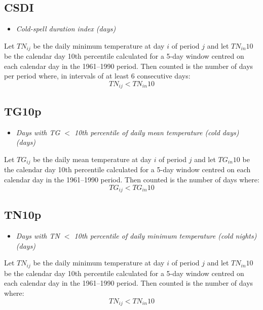 \documentclass[a4paper,11pt]{article}
\begin{document}
\subsection*{CSDI}
\begin{itemize}
\item \textit{Cold-spell duration index (days)}
\end{itemize}
Let $TN_{ij}$ be the daily minimum temperature at day $i$ of period
$j$ and let $TN_{in}10$ be the calendar day 10th percentile calculated
for a 5-day window centred on each calendar day in the 1961--1990
period. Then counted is the number of days per period where, in
intervals of at least 6 consecutive days:
\begin{equation*}
TN_{ij} < TN_{in}10
\end{equation*}

\subsection*{TG10p}
\begin{itemize}
\item \textit{Days with TG $<$ 10th percentile of daily mean temperature
(cold days) (days)}
\end{itemize}
Let $TG_{ij}$ be the daily mean temperature at day $i$ of period $j$
and let $TG_{in}10$ be the calendar day 10th percentile calculated for
a 5-day window centred on each calendar day in the 1961--1990
period. Then counted is the number of days where:
\begin{equation*}
TG_{ij} < TG_{in}10
\end{equation*}

\subsection*{TN10p}
\begin{itemize}
\item \textit{Days with TN $<$ 10th percentile of daily minimum
temperature (cold nights) (days)}
\end{itemize}
Let $TN_{ij}$ be the daily minimum temperature at day $i$ of period
$j$ and let $TN_{in}10$ be the calendar day 10th percentile calculated
for a 5-day window centred on each calendar day in the 1961--1990
period. Then counted is the number of days where:
\begin{equation*}
TN_{ij} < TN_{in}10
\end{equation*}
\end{document}
